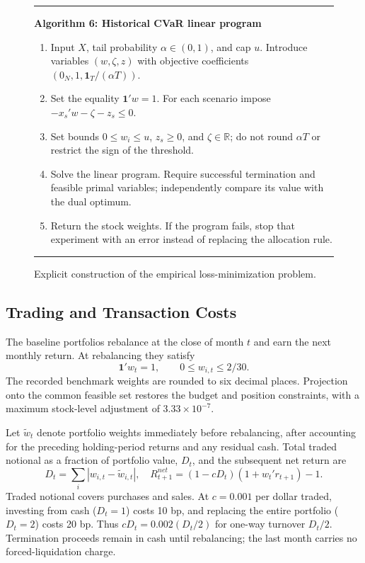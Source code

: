 \documentclass[letterpaper,journal]{IEEEtran}
\newcommand{\R}{\mathbb{R}}
\begin{document}
\begin{figure}[t]\centering
\begin{minipage}{0.96\textwidth}\hrule\smallskip
\textbf{Algorithm 6: Historical CVaR linear program}\smallskip
\begin{enumerate}\setlength{\itemsep}{1pt}
\item Input $X$, tail probability $\alpha\in(0,1)$, and cap $u$. Introduce variables $(w,\zeta,z)$ with objective coefficients $(0_N,1,\mathbf1_T/(\alpha T))$.
\item Set the equality $\mathbf1'w=1$. For each scenario impose $-x_s'w-\zeta-z_s\leq0$.
\item Set bounds $0\leq w_i\leq u$, $z_s\geq0$, and $\zeta\in\R$; do not round $\alpha T$ or restrict the sign of the threshold.
\item Solve the linear program. Require successful termination and feasible primal variables; independently compare its value with the dual optimum.
\item Return the stock weights. If the program fails, stop that experiment with an error instead of replacing the allocation rule.
\end{enumerate}\hrule
\end{minipage}
\caption{Explicit construction of the empirical loss-minimization problem.}\label{alg:cvar}
\end{figure}

\subsection{Trading and Transaction Costs}
The baseline portfolios rebalance at the close of month $t$ and earn the next monthly return. At rebalancing they satisfy
\begin{equation}
 \mathbf{1}'w_t=1,\qquad 0\leq w_{i,t}\leq 2/30.
\end{equation}
The recorded benchmark weights are rounded to six decimal places. Projection onto the common feasible set restores the budget and position constraints, with a maximum stock-level adjustment of $3.33\times10^{-7}$.

Let $\widetilde w_t$ denote portfolio weights immediately before rebalancing, after accounting for the preceding holding-period returns and any residual cash. Total traded notional as a fraction of portfolio value, $D_t$, and the subsequent net return are
\begin{equation}
 D_t=\sum_i|w_{i,t}-\widetilde w_{i,t}|,
 \quad R^{net}_{t+1}=(1-cD_t)(1+w_t'r_{t+1})-1.
\end{equation}
Traded notional covers purchases and sales. At $c=0.001$ per dollar traded, investing from cash ($D_t=1$) costs 10 bp, and replacing the entire portfolio ($D_t=2$) costs 20 bp. Thus $cD_t=0.002(D_t/2)$ for one-way turnover $D_t/2$. Termination proceeds remain in cash until rebalancing; the last month carries no forced-liquidation charge.
\end{document}
